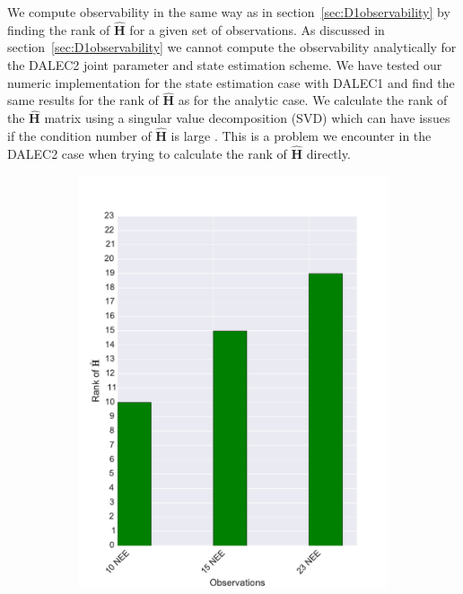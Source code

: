 \documentclass[11pt]{article}
\begin{document}
We compute observability in the same way as in section~\ref{sec:D1observability} by finding the rank of $\hat{\textbf{H}}$ for a given set of observations. As discussed in section~\ref{sec:D1observability} we cannot compute the observability analytically for the DALEC2 joint parameter and state estimation scheme. We have tested our numeric implementation for the state estimation case with DALEC1 and find the same results for the rank of $\hat{\textbf{H}}$ as for the analytic case. We calculate the rank of the $\hat{\textbf{H}}$ matrix using a singular value decomposition (SVD) which can have issues if the condition number of $\hat{\textbf{H}}$ is large \citep{Paige1981}. This is a problem we encounter in the DALEC2 case when trying to calculate the rank of $\hat{\textbf{H}}$ directly.  

\begin{figure}[ht]
    \centering
    \begin{subfigure}[b]{0.49\textwidth}
        \includegraphics[width=\textwidth]{dalec2_obsrank.pdf}

\end{subfigure}
\end{figure}
\end{document}
